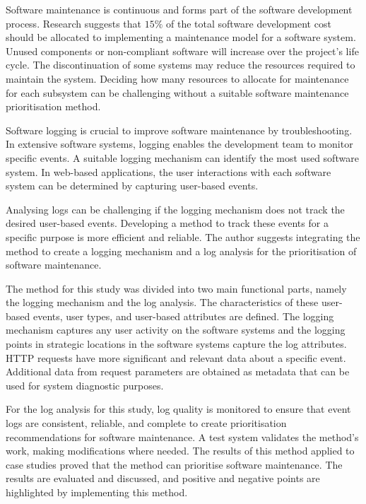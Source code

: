 Software maintenance is continuous and forms part of the software development process. Research suggests that $15\%$ of the total software development cost should be allocated to implementing a maintenance model for a software system. Unused components or non-compliant software will increase over the project's life cycle. The discontinuation of some systems may reduce the resources required to maintain the system. Deciding how many resources to allocate for maintenance for each subsystem can be challenging without a suitable software maintenance prioritisation method. \par Software logging is crucial to improve software maintenance by troubleshooting. In extensive software systems, logging enables the development team to monitor specific events. A suitable logging mechanism can identify the most used software system. In web-based applications, the user interactions with each software system can be determined by capturing user-based events. \par Analysing logs can be challenging if the logging mechanism does not track the desired user-based events. Developing a method to track these events for a specific purpose is more efficient and reliable. The author suggests integrating the method to create a logging mechanism and a log analysis for the prioritisation of software maintenance. \par The method for this study was divided into two main functional parts, namely the logging mechanism and the log analysis. The characteristics of these user-based events, user types, and user-based attributes are defined. The logging mechanism captures any user activity on the software systems and the logging points in strategic locations in the software systems capture the log attributes. HTTP requests have more significant and relevant data about a specific event. Additional data from request parameters are obtained as metadata that can be used for system diagnostic purposes. \par For the log analysis for this study, log quality is monitored to ensure that event logs are consistent, reliable, and complete to create prioritisation recommendations for software maintenance. A test system validates the method's work, making modifications where needed. The results of this method applied to case studies proved that the method can prioritise software maintenance. The results are evaluated and discussed, and positive and negative points are highlighted by implementing this method.
